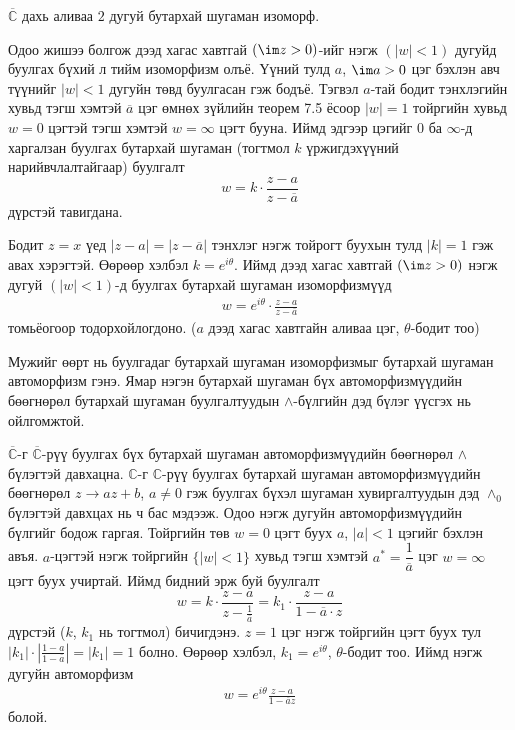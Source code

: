 \begin{thm}
$\overline{\mathbb{C}}$ дахь аливаа $2$ дугуй бутархай шугаман изоморф.

Одоо жишээ болгож дээд хагас хавтгай $(\im z>0)$-ийг нэгж $(|w|<1)$ дугуйд буулгах бүхий л тийм изоморфизм олъё. Үүний тулд $a$, $\im a>0$ цэг бэхлэн авч түүнийг $|w|<1$ дугуйн төвд буулгасан гэж бодъё. Тэгвэл $a$-тай бодит тэнхлэгийн хувьд тэгш хэмтэй $\overline{a}$ цэг өмнөх зүйлийн теорем 7.5 ёсоор $|w|=1$ тойргийн хувьд $w=0$ цэгтэй тэгш хэмтэй $w=\infty$ цэгт бууна. Иймд эдгээр цэгийг $0$ ба $\infty$-д харгалзан буулгах бутархай шугаман (тогтмол $k$ үржигдэхүүний нарийвчлалтайгаар) буулгалт
$$w=k\cdot \frac{z-a}{z-\overline{a}}$$
дүрстэй тавигдана.

Бодит $z=x$ үед $|z-a|=|z-\overline{a}|$ тэнхлэг нэгж тойрогт буухын тулд $|k|=1$ гэж авах хэрэгтэй. Өөрөөр хэлбэл $k=e^{i\theta}$. Иймд дээд хагас хавтгай $(\im z>0)$ нэгж дугуй $(|w|<1)$-д буулгах бутархай шугаман изоморфизмүүд 
\begin{eqnarray} \label{7.18}
w=e^{i\theta}\cdot \frac{z-a}{z-\overline{a}}
\end{eqnarray}
томьёогоор тодорхойлогдоно. ($a$ дээд хагас хавтгайн аливаа цэг, $\theta$-бодит тоо)

Мужийг өөрт нь буулгадаг бутархай шугаман изоморфизмыг бутархай шугаман автоморфизм гэнэ. Ямар нэгэн бутархай шугаман бүх автоморфизмүүдийн бөөгнөрөл бутархай шугаман буулгалтуудын $\wedge$-бүлгийн дэд бүлэг үүсгэх нь ойлгомжтой.

$\overline{\mathbb{C}}$-г $\overline{\mathbb{C}}$-рүү буулгах бүх бутархай шугаман автоморфизмүүдийн бөөгнөрөл $\wedge$ бүлэгтэй давхацна. $\mathbb{C}$-г $\mathbb{C}$-рүү буулгах бутархай шугаман автоморфизмүүдийн бөөгнөрөл $z\rightarrow az+b$, $a\neq 0$ гэж буулгах бүхэл шугаман хувиргалтуудын дэд $\wedge_0$ бүлэгтэй давхцах нь ч бас мэдээж. Одоо нэгж дугуйн автоморфизмүүдийн бүлгийг бодож гаргая. Тойргийн төв $w=0$ цэгт буух $a$, $|a|<1$ цэгийг бэхлэн авъя. $a$-цэгтэй нэгж тойргийн $\{|w|<1\}$ хувьд тэгш хэмтэй $a^*=\dfrac{1}{\overline{a}}$ цэг $w=\infty$ цэгт буух учиртай. Иймд бидний эрж буй буулгалт
$$w=k\cdot \frac{z-a}{z-\frac{1}{\overline{a}}}=k_1\cdot \frac{z-a}{1-\overline{a}\cdot z}$$
дүрстэй ($k$, $k_1$ нь тогтмол) бичигдэнэ. $z=1$ цэг нэгж тойргийн цэгт буух тул $|k_1|\cdot \left|\frac{1-a}{1-\overline{a}}\right|=|k_1|=1$ болно. Өөрөөр хэлбэл, $k_1=e^{i\theta}$, $\theta$-бодит тоо. Иймд нэгж дугуйн автоморфизм
\begin{eqnarray}
w=e^{i\theta}\frac{z-a}{1-\overline{a}z}
\end{eqnarray} болой.
\end{thm}

